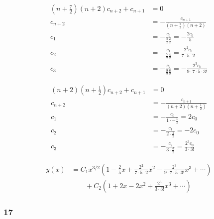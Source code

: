 \documentclass{article}
\begin{document}
\begin{align*}
  \left( n + \frac{7}{2} \right) (n + 2) c_{n + 2} + c_{n + 1} & = 0                                                                                  \\
  c_{n + 2}                                                    & = -\frac{c_{n + 1}}{\left( n + \frac{7}{2} \right) (n + 2)}                          \\
  c_1                                                          & = -\frac{c_0}{\frac{5}{2} \frac{2}{2}} = -\frac{2 c_0}{5}                            \\
  c_2                                                          & = -\frac{c_1}{\frac{7}{2} \frac{4}{2}} = \frac{2^2 c_0}{7 \cdot 5 \cdot 2}           \\
  c_3                                                          & = -\frac{c_2}{\frac{9}{2} \frac{6}{2}} = -\frac{2^3 c_0}{9 \cdot 7 \cdot 5 \cdot 3!}
\end{align*}

\begin{align*}
  (n + 2) \left( n + \frac{1}{2} \right) c_{n + 2} + c_{n + 1} & = 0                                                             \\
  c_{n + 2}                                                    & = -\frac{c_{n + 1}}{(n + 2) \left( n + \frac{1}{2} \right)}     \\
  c_1                                                          & = -\frac{c_0}{1 \cdot -\frac{1}{2}} = 2 c_0                     \\
  c_2                                                          & = -\frac{c_1}{2 \cdot \frac{1}{2}} = -2 c_0                     \\
  c_3                                                          & = -\frac{c_2}{3 \cdot \frac{3}{2}} = \frac{2^3 c_0}{3 \cdot 3!}
\end{align*}

\begin{align*}
  y(x) & = C_1 x^{3 / 2} \left( 1 - \frac{2}{5} x + \frac{2^2}{7 \cdot 5 \cdot 2} x^2 - \frac{2^3}{9 \cdot 7 \cdot 5 \cdot 3!} x^3 + \cdots \right) \\
       & \qquad + C_2 \left( 1 + 2 x - 2 x^2 + \frac{2^3}{3 \cdot 3!} x^3 + \cdots \right)
\end{align*}

\subsubsection{17}
\end{document}
